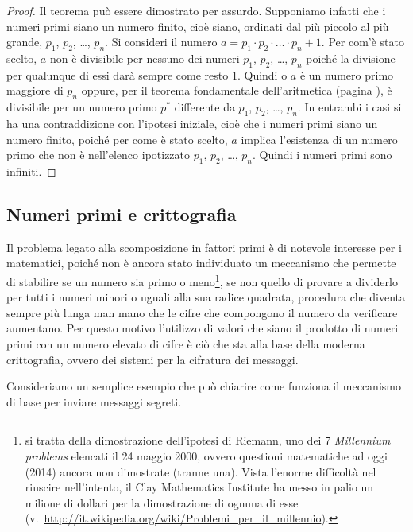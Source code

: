 \begin{proof}
Il teorema può essere dimostrato per assurdo.
Supponiamo infatti che i numeri primi siano un numero finito, cioè siano, ordinati dal più piccolo al più grande, $p_1$, $p_2$, \ldots{}, $p_n$. Si consideri il numero $a=p_1\cdot p_2\cdot \ldots{}\cdot p_n+1$. Per com'è stato scelto, $a$ non è divisibile per nessuno dei numeri $p_1$, $p_2$, \ldots{}, $p_n$ poiché la divisione per qualunque di essi darà sempre come resto 1. Quindi o $a$ è un numero primo maggiore di $p_n$ oppure, per il teorema fondamentale dell'aritmetica (pagina \pageref{th:fondamentale_dell_aritmetica}), è divisibile per un numero primo $p^*$ differente da $p_1$, $p_2$, \ldots{}, $p_n$. In entrambi i casi si ha una contraddizione con l'ipotesi iniziale, cioè che i numeri primi siano un numero finito, poiché per come è stato scelto, $a$ implica l'esistenza di un numero primo che non è nell'elenco ipotizzato $p_1$, $p_2$, \ldots, $p_n$. Quindi i numeri primi sono infiniti.
\end{proof}

\ovalbox{\risolvii \ref{ese:1.19}, \ref{ese:1.20}}


\subsection{Numeri primi e crittografia}

Il problema legato alla scomposizione in fattori primi è di notevole interesse per i matematici, poiché non è ancora stato individuato un meccanismo che permette di stabilire se un numero sia primo o meno\footnote{si tratta della dimostrazione dell'ipotesi di Riemann, uno dei 7 \emph{Millennium problems} elencati il 24 maggio 2000, ovvero questioni matematiche ad oggi (2014) ancora non dimostrate (tranne una). Vista l'enorme difficoltà nel riuscire nell'intento, il Clay Mathematics Institute ha messo in palio un milione di dollari per la dimostrazione di ognuna di esse (v.~\url{http://it.wikipedia.org/wiki/Problemi_per_il_millennio}).}, se non quello di provare a dividerlo per tutti i numeri minori o uguali alla sua radice quadrata, procedura che diventa sempre più lunga man mano che le cifre che compongono il numero da verificare aumentano. Per questo motivo l'utilizzo di valori che siano il prodotto di numeri primi con un numero elevato di cifre è ciò che sta alla base della moderna crittografia, ovvero dei sistemi per la cifratura dei messaggi.

Consideriamo un semplice esempio che può chiarire come funziona il meccanismo di base per inviare messaggi segreti.

